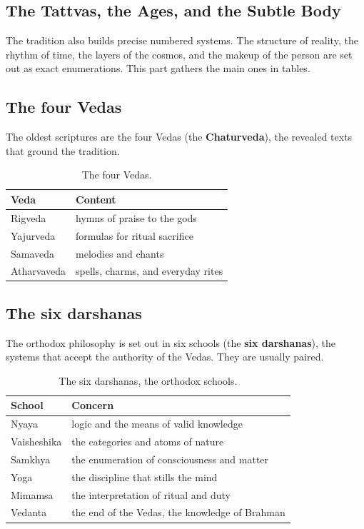 \subsection{The Tattvas, the Ages, and the Subtle Body}

The tradition also builds precise numbered systems. The structure of reality, the rhythm of time, the layers of the cosmos, and the makeup of the person are set out as exact enumerations. This part gathers the main ones in tables.

\subsection{The four Vedas}

The oldest scriptures are the four Vedas (the \textbf{Chaturveda}), the revealed texts that ground the tradition.

\begin{longtable}{@{} L{0.26\textwidth}L{0.56\textwidth}@{}}
\caption{The four Vedas.}\\
\toprule
\textbf{Veda} & \textbf{Content} \\
\midrule
Rigveda & hymns of praise to the gods \\
Yajurveda & formulas for ritual sacrifice \\
Samaveda & melodies and chants \\
Atharvaveda & spells, charms, and everyday rites \\
\bottomrule
\end{longtable}

\subsection{The six darshanas}

The orthodox philosophy is set out in six schools (the \textbf{six darshanas}), the systems that accept the authority of the Vedas. They are usually paired.

\begin{longtable}{@{} L{0.26\textwidth}L{0.56\textwidth}@{}}
\caption{The six darshanas, the orthodox schools.}\\
\toprule
\textbf{School} & \textbf{Concern} \\
\midrule
Nyaya & logic and the means of valid knowledge \\
Vaisheshika & the categories and atoms of nature \\
Samkhya & the enumeration of consciousness and matter \\
Yoga & the discipline that stills the mind \\
Mimamsa & the interpretation of ritual and duty \\
Vedanta & the end of the Vedas, the knowledge of Brahman \\
\bottomrule
\end{longtable}

